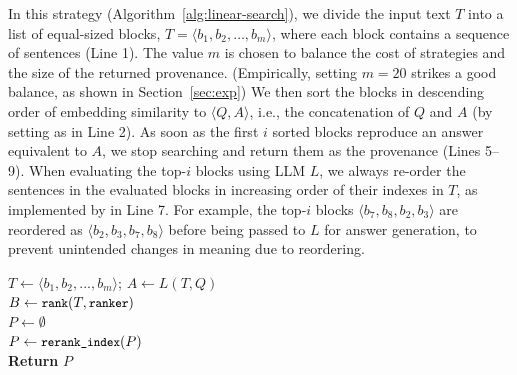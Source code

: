 \vspace{1pt}
 In this strategy  (Algorithm~\ref{alg:linear-search}), we divide the input text $T$ into a list of equal-sized blocks, $T = \langle b_1, b_2, \dots, b_m\rangle$, where each block contains a sequence of sentences (Line 1). The value $m$ is chosen to balance the cost of strategies and the size of the returned provenance. (Empirically, setting $m = 20$ strikes a good balance, as shown in Section~\ref{sec:exp})  
  We then sort the blocks in descending order of embedding similarity to $\langle Q,A \rangle$, i.e., 
the concatenation of $Q$ and $A$ (by setting  as  in Line 2).  
As soon as the first $i$ sorted blocks reproduce an answer equivalent to $A$, we stop searching and return them as the provenance (Lines 5–9). When evaluating the top-$i$ blocks using LLM $L$, we always re-order the sentences in the evaluated blocks in increasing order of their indexes in $T$, as implemented by  in Line 7. For example, the top-$i$ blocks $\langle b_7,b_8, b_2, b_3 \rangle$ are reordered as $\langle b_2, b_3, b_7,b_8 \rangle$ before being passed to $L$ for answer generation, to prevent unintended changes in meaning due to reordering. 


\setlength{\textfloatsep}{0pt}
\begin{algorithm}[bt]
    \scriptsize
    \caption{[, ]}
    \label{alg:linear-search}
$T \leftarrow \langle b_1,b_2,...,b_m\rangle$; $A \leftarrow L(T,Q)$ \\ 
$B \leftarrow \texttt{\small rank}(T, \texttt{\small ranker})$ \\ 
$P \leftarrow \emptyset$ \\ 
{}
$P \leftarrow \texttt{\small rerank\_index}(P)$ \\ 
\textbf{Return} $P$\\
\end{algorithm}



